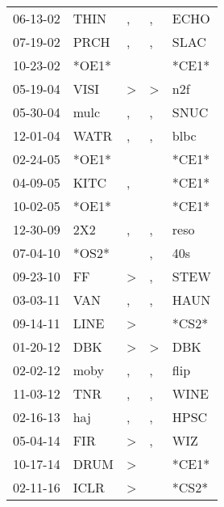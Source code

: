 \begin{supertabular}{lllll}
 06-13-02 &   THIN &             , &             , &   ECHO \\
 07-19-02 &   PRCH &             , &             , &   SLAC \\
 10-23-02 &  *OE1* &               &               &  *CE1* \\
 05-19-04 &   VISI &  \textgreater &  \textgreater &    n2f \\
 05-30-04 &   mulc &             , &             , &   SNUC \\
 12-01-04 &   WATR &             , &             , &   blbc \\
 02-24-05 &  *OE1* &               &               &  *CE1* \\
 04-09-05 &   KITC &             , &               &  *CE1* \\
 10-02-05 &  *OE1* &               &               &  *CE1* \\
 12-30-09 &    2X2 &             , &             , &   reso \\
 07-04-10 &  *OS2* &               &             , &    40s \\
 09-23-10 &     FF &  \textgreater &             , &   STEW \\
 03-03-11 &    VAN &             , &             , &   HAUN \\
 09-14-11 &   LINE &  \textgreater &               &  *CS2* \\
 01-20-12 &    DBK &  \textgreater &  \textgreater &    DBK \\
 02-02-12 &   moby &             , &             , &   flip \\
 11-03-12 &    TNR &             , &             , &   WINE \\
 02-16-13 &    haj &             , &             , &   HPSC \\
 05-04-14 &    FIR &  \textgreater &             , &    WIZ \\
 10-17-14 &   DRUM &  \textgreater &               &  *CE1* \\
 02-11-16 &   ICLR &  \textgreater &               &  *CS2* \\
\end{supertabular}
